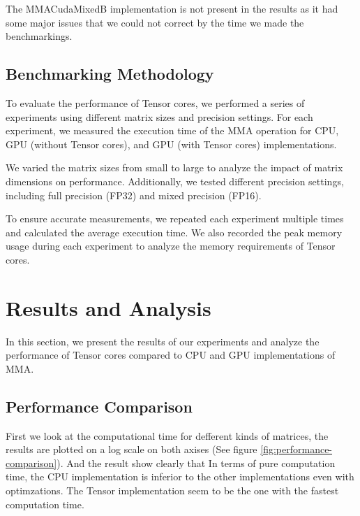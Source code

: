 \documentclass[conference]{IEEEtran}
\begin{document}
  The MMACudaMixedB implementation is not present in the results as it had some major issues that we could
  not correct by the time we made the benchmarkings.

  \subsection{Benchmarking Methodology}\label{sec:benchmarking-methodology}
  
  To evaluate the performance of Tensor cores, we performed a series of experiments using different 
  matrix sizes and precision settings. For each experiment, we measured the execution time of the 
  MMA operation for CPU, GPU (without Tensor cores), and GPU (with Tensor cores) implementations.
  
  We varied the matrix sizes from small to large to analyze the impact of matrix dimensions on 
  performance. Additionally, we tested different precision settings, including full precision (FP32)
  and mixed precision (FP16).
  
  To ensure accurate measurements, we repeated each experiment multiple times and calculated 
  the average execution time. We also recorded the peak memory usage during each experiment to 
  analyze the memory requirements of Tensor cores.
  
  \section{Results and Analysis}\label{sec:results-analysis}
  
  In this section, we present the results of our experiments and analyze the performance of 
  Tensor cores compared to CPU and GPU implementations of MMA.

  
  \subsection{Performance Comparison}\label{sec:performance-comparison}

  First we look at the computational time for defferent kinds of matrices,
  the results are plotted on a log scale on both axises (See figure \ref{fig:performance-comparison}). And the result show clearly that
  In terms of pure computation time, the CPU implementation is inferior to the other implementations even with optimzations.
  The Tensor implementation seem to be the one with the fastest computation time.
\end{document}
